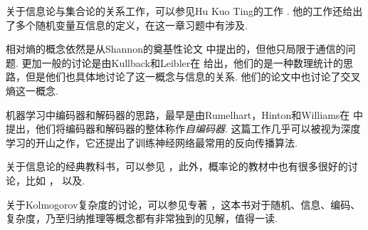 关于信息论与集合论的关系工作，可以参见Hu Kuo Ting的工作 \cite{tingAmountInformation1962a}. 他的工作还给出了多个随机变量互信息的定义，在这一章习题中有涉及.

相对熵的概念依然是从Shannon的奠基性论文 \cite{shannonMathematicalTheoryCommunication1948} 中提出的，但他只局限于通信的问题. 更加一般的讨论是由Kullback和Leibler在 \cite{kullbackInformationSufficiency1951} 给出，他们的是一种数理统计的思路，但是他们也具体地讨论了这一概念与信息的关系. 他们的论文中也讨论了交叉熵这一概念. 

机器学习中编码器和解码器的思路，最早是由Rumelhart，Hinton和Williams在 \cite{rumelhartLearningInternalRepresentations1986} 中提出，他们将编码器和解码器的整体称作\emph{自编码器}. 这篇工作几乎可以被视为深度学习的开山之作，它还提出了训练神经网络最常用的反向传播算法.

关于信息论的经典教科书，可以参见 \cite{coverElementsInformationTheory2012} ，此外，概率论的教材中也有很多很好的讨论，比如 \cite{jaynesProbabilityTheoryLogic2002}，\cite{shiryaevProbability1996} 以及\cite{LiXianPingGaiLuLunJiChu2010}.

关于Kolmogorov复杂度的讨论，可以参见专著 \cite{???}，这本书对于随机、信息、编码、复杂度，乃至归纳推理等概念都有非常独到的见解，值得一读. 